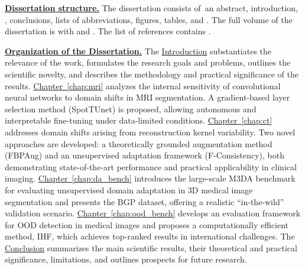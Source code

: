 \underline{\textbf{Dissertation structure.}} %
The dissertation consists of~an abstract, introduction, , conclusions, lists of abbreviations, figures, tables, and . The full volume of the dissertation is  with  and . The list of references contains .

\underline{\textbf{Organization of the Dissertation.}}
The \underline{Introduction} substantiates the relevance of the work, formulates the research goals and problems, outlines the scientific novelty, and describes the methodology and practical significance of the results.
\underline{Chapter~\ref{chap:mri}} analyzes the internal sensitivity of convolutional neural networks to domain shifts in MRI segmentation. A gradient-based layer selection method (SpotTUnet) is proposed, allowing autonomous and interpretable fine-tuning under data-limited conditions.
\underline{Chapter~\ref{chap:ct}} addresses domain shifts arising from reconstruction kernel variability. Two novel approaches are developed: a theoretically grounded augmentation method (FBPAug) and an unsupervised adaptation framework (F-Consistency), both demonstrating state-of-the-art performance and practical applicability in clinical imaging.
\underline{Chapter~\ref{chap:da_bench}} introduces the large-scale M3DA benchmark for evaluating unsupervised domain adaptation in 3D medical image segmentation and presents the BGP dataset, offering a realistic “in-the-wild” validation scenario.
\underline{Chapter~\ref{chap:ood_bench}}  develops an evaluation framework for OOD detection in medical images and proposes a computationally efficient method, IHF, which achieves top-ranked results in international challenges.
The \underline{Conclusion} summarizes the main scientific results, their theoretical and practical significance, limitations, and outlines prospects for future research.







